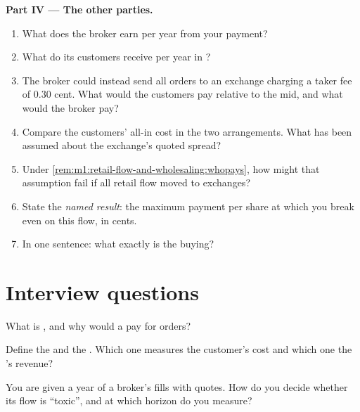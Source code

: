 \begin{problem}
\medskip\noindent\textbf{Part IV --- The other parties.}
\begin{enumerate}[resume]
\item What does the broker earn per year from your payment?
\item What do its customers receive per year in ?
\item The broker could instead send all orders to an exchange charging a
taker fee of 0.30 cent. What would the customers pay relative to the mid, and
what would the broker pay?
\item Compare the customers' all-in cost in the two arrangements. What has
been assumed about the exchange's quoted spread?
\item Under \cref{rem:m1:retail-flow-and-wholesaling:whopays}, how might that
assumption fail if all retail flow moved to exchanges?
\item State the \emph{named result}: the maximum payment per share at which
you break even on this flow, in cents.
\item In one sentence: what exactly is the  buying?
\end{enumerate}
\end{problem}

\section{Interview questions}

\begin{interviewq}\label{iq:m1:retail-flow-and-wholesaling:1}
What is , and why would a  pay for orders?
\end{interviewq}

\begin{interviewq}\label{iq:m1:retail-flow-and-wholesaling:2}
Define the  and the . Which one measures the
customer's cost and which one the 's revenue?
\end{interviewq}

\begin{interviewq}\label{iq:m1:retail-flow-and-wholesaling:3}
You are given a year of a broker's fills with quotes. How do you decide
whether its flow is ``toxic'', and at which horizon do you measure?
\end{interviewq}

